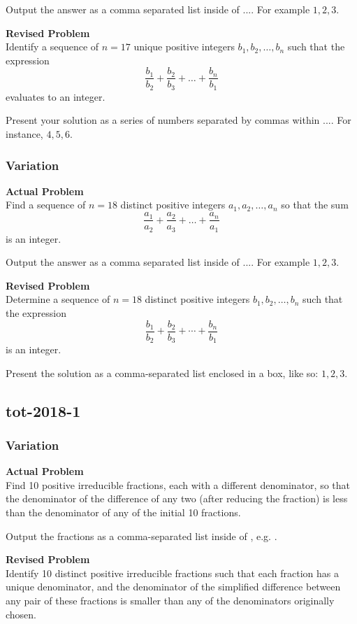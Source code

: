Output the answer as a comma separated list inside of $\boxed{...}$. For example $\boxed{1, 2, 3}$.

\textbf{Revised Problem}\\
Identify a sequence of $n = 17$ unique positive integers $b_1, b_2, \ldots, b_n$ such that the expression
$$\frac{b_1}{b_2} + \frac{b_2}{b_3} + \ldots +\frac{b_n}{b_1}$$ evaluates to an integer.

Present your solution as a series of numbers separated by commas within $\boxed{...}$. For instance, $\boxed{4, 5, 6}$.

\subsubsection{Variation}
\textbf{Actual Problem}\\
Find a sequence of $n = 18$ distinct positive integers $a_1, a_2, \ldots, a_n$ so that the sum
$$\frac{a_1}{a_2} + \frac{a_2}{a_3} + \ldots +\frac{a_n}{a_1}$$ is an integer.

Output the answer as a comma separated list inside of $\boxed{...}$. For example $\boxed{1, 2, 3}$.

\textbf{Revised Problem}\\
Determine a sequence of $n = 18$ distinct positive integers $b_1, b_2, \ldots, b_n$ such that the expression
$$\frac{b_1}{b_2} + \frac{b_2}{b_3} + \cdots + \frac{b_n}{b_1}$$ is an integer.

Present the solution as a comma-separated list enclosed in a box, like so: $\boxed{1, 2, 3}$.

\subsection{tot-2018-1}
\subsubsection{Variation}
\textbf{Actual Problem}\\
Find 10 positive irreducible fractions, each with a different denominator, so that the denominator of the difference of any two (after reducing the fraction) is less than the denominator of any of the initial 10 fractions.

Output the fractions as a comma-separated list inside of \boxed, e.g. .

\textbf{Revised Problem}\\
Identify 10 distinct positive irreducible fractions such that each fraction has a unique denominator, and the denominator of the simplified difference between any pair of these fractions is smaller than any of the denominators originally chosen.


